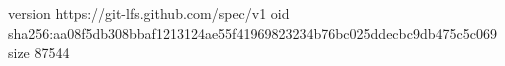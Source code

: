 version https://git-lfs.github.com/spec/v1
oid sha256:aa08f5db308bbaf1213124ae55f41969823234b76bc025ddecbc9db475c5c069
size 87544
